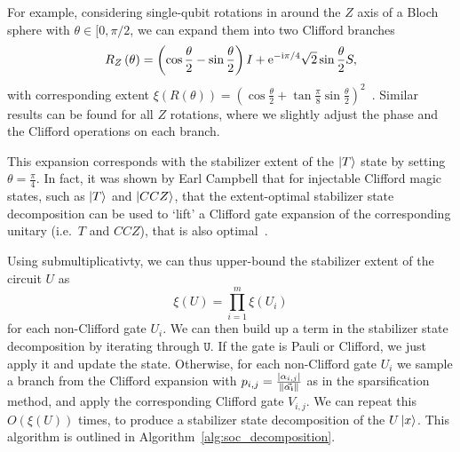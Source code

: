 For example, considering single-qubit rotations in around the $Z$ axis of a Bloch sphere with $\theta\in[0,\pi/2$, we can expand them into two Clifford branches
\begin{equation}
R_{Z}\left(\theta\right) = \left(\cos{\frac{\theta}{2}}-\sin{\frac{\theta}{2}}\right)I + \mathrm{e}^{-\mathrm{i}\pi/4}\sqrt{2}\sin{\frac{\theta}{2}}S,
\label{eq:rotation_expansion}
\end{equation}
with corresponding extent $\xi\left(R\left(\theta\right)\right)=\left(\cos{\frac{\theta}{2}}+\tan{\frac{\pi}{8}}\sin{\frac{\theta}{2}}\right)^{2}$~\cite{Bravyi2018}. Similar results can be found for all $Z$ rotations, where we slightly adjust the phase and the Clifford operations on each branch.\par
This expansion corresponds with the stabilizer extent of the $\ket{T}$ state by setting $\theta=\frac{\pi}{4}$. In fact, it was shown by Earl Campbell that for injectable Clifford magic states, such as $\ket{T}$ and $\ket{CCZ}$, that the extent-optimal stabilizer state decomposition can be used to `lift' a Clifford gate expansion of the corresponding unitary (i.e.\ $T$ and $CCZ$), that is also optimal~\cite{Bravyi2018}.\par
Using submultiplicativty, we can thus upper-bound the stabilizer extent of the circuit $U$ as
\begin{equation}
\xi\left(U\right) = \prod_{i=1}^{m}\xi\left(U_{i}\right)
\end{equation}
for each non-Clifford gate $U_{i}$. We can then build up a term in the stabilizer state decomposition by iterating through $\mathtt{U}$. If the gate is Pauli or Clifford, we just apply it and update the state. Otherwise, for each non-Clifford gate $U_{i}$ we sample a branch from the Clifford expansion with $p_{i,j}=\frac{\left|\alpha_{i,j}\right|}{\norm{\va{\alpha_{i}}}}$ as in the sparsification method, and apply the corresponding Clifford gate $V_{i,j}$. We can repeat this $O(\xi\left(U\right))$ times, to produce a stabilizer state decomposition of the $U\ket{x}$. This algorithm is outlined in Algorithm~\ref{alg:soc_decomposition}.\par
